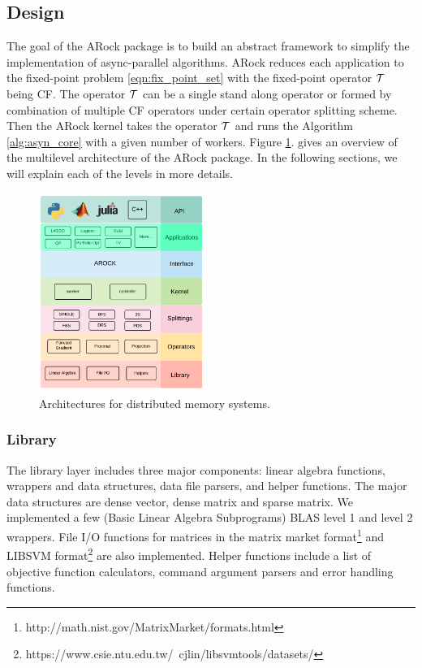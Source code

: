 \subsection{Design}
The goal of the ARock package is to build an abstract framework to simplify the implementation of async-parallel algorithms. ARock reduces each application to the fixed-point problem \eqref{eqn:fix_point_set} with the fixed-point operator ${\mathcal{T}}$ being CF. The operator ${\mathcal{T}}$ can be a single stand along operator or formed by combination of multiple CF operators under certain operator splitting scheme. Then the ARock kernel takes the operator ${\mathcal{T}}$ and runs the Algorithm \ref{alg:asyn_core} with a given number of workers.  Figure \ref{fig:arch}. gives an overview of the multilevel architecture of the ARock package. In the following sections, we will explain each of the levels in more details. 
\begin{figure}[!h]
      \centering
        \includegraphics[width=0.48\textwidth]{./figs/architecture.png}
      \caption{Architectures for distributed memory systems.}
        \label{fig:arch}
\end{figure}


\subsubsection{Library}
The library layer includes three major components: linear algebra functions, wrappers and data structures, data file parsers, and helper functions. The major data structures are dense vector, dense matrix and sparse matrix. We implemented a few (Basic Linear Algebra Subprograms) BLAS level 1 and level 2 wrappers. File I/O functions for matrices in the matrix market format\footnote{http://math.nist.gov/MatrixMarket/formats.html} and LIBSVM format\footnote{https://www.csie.ntu.edu.tw/~cjlin/libsvmtools/datasets/} are also implemented. Helper functions include a list of objective function calculators, command argument parsers and error handling functions. 

